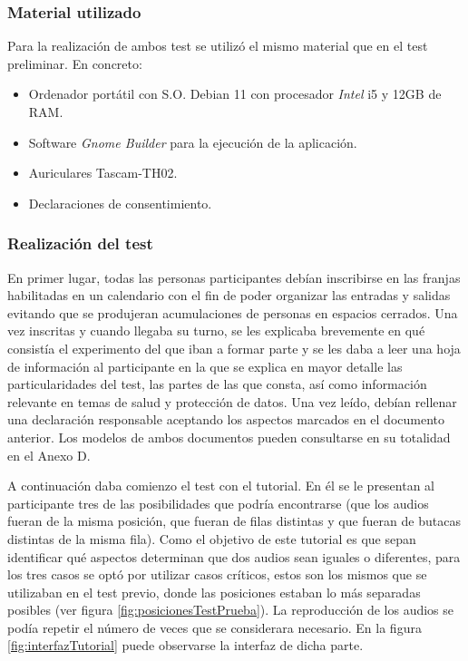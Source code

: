 \documentclass[11pt,a4paper]{book}
\begin{document}
                \subsubsection*{Material utilizado}
                    Para la realización de ambos test se utilizó el mismo material que en el test preliminar. En concreto:
                    \begin{itemize}
                        \item Ordenador portátil con S.O. Debian 11 con procesador \textit{Intel} i5 y 12GB de RAM.
                        \item Software \textit{Gnome Builder} para la ejecución de la aplicación.
                        \item Auriculares Tascam-TH02.
                        \item Declaraciones de consentimiento.
                        
                    \end{itemize}
                
                \subsubsection*{Realización del test}
                    En primer lugar, todas las personas participantes debían inscribirse en las franjas habilitadas en un calendario con el fin de poder organizar las entradas y salidas evitando que se produjeran acumulaciones de personas en espacios cerrados. Una vez inscritas y cuando llegaba su turno, se les explicaba brevemente en qué consistía el experimento del que iban a formar parte y se les daba a leer una hoja de información al participante en la que se explica en mayor detalle las particularidades del test, las partes de las que consta, así como información relevante en temas de salud y protección de datos. Una vez leído, debían rellenar una declaración responsable aceptando los aspectos marcados en el documento anterior. Los modelos de ambos documentos pueden consultarse en su totalidad en el Anexo D.
                
                    A continuación daba comienzo el test con el tutorial. En él se le presentan al participante tres de las posibilidades que podría encontrarse (que los audios fueran de la misma posición, que fueran de filas distintas y que fueran de butacas distintas de la misma fila). Como el objetivo de este tutorial es que sepan identificar qué aspectos determinan que dos audios sean iguales o diferentes, para los tres casos se optó por utilizar casos críticos, estos son los mismos que se utilizaban en el test previo, donde las posiciones estaban lo más separadas posibles (ver figura \ref{fig:posicionesTestPrueba}). La reproducción de los audios se podía repetir el número de veces que se considerara necesario. En la figura \ref{fig:interfazTutorial} puede observarse la interfaz de dicha parte.
                
\end{document}
